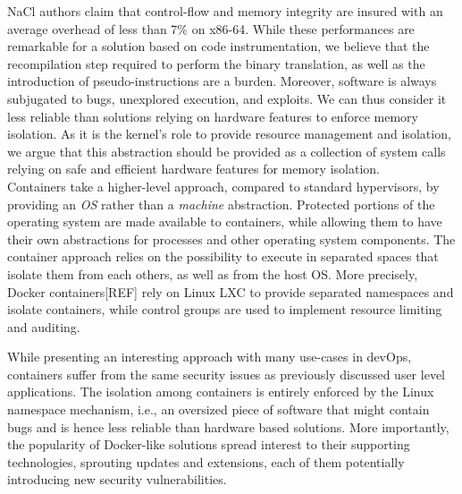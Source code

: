 \documentclass[letterpaper,twocolumn,10pt]{article}
\begin{document}
NaCl authors claim that control-flow and memory integrity are insured with an average overhead of less than 7\% on x86-64.
While these performances are remarkable for a solution based on code instrumentation, we believe that the recompilation step required to perform the binary translation, as well as the introduction of pseudo-instructions are a burden.
Moreover, software is always subjugated to bugs, unexplored execution, and exploits.
We can thus consider it less reliable than solutions relying on hardware features to enforce memory isolation.
As it is the kernel's role to provide resource management and isolation, we argue that this abstraction should be provided as a collection of system calls relying on safe and efficient hardware features for memory isolation. \\

Containers take a higher-level approach, compared to standard hypervisors, by providing an \emph{OS} rather than a \emph{machine} abstraction.
Protected portions of the operating system are made available to containers, while allowing them to have their own abstractions for processes and other operating system components.
The container approach relies on the possibility to execute in separated spaces that isolate them from each others, as well as from the host OS.
More precisely, Docker containers[REF] rely on Linux LXC to provide separated namespaces and isolate containers, while control groups are used to implement resource limiting and auditing.

While presenting an interesting approach with many use-cases in devOps, containers suffer from the same security issues as previously discussed user level applications.
The isolation among containers is entirely enforced by the Linux namespace mechanism, i.e., an oversized piece of software that might contain bugs and is hence less reliable than hardware based solutions.
More importantly, the popularity of Docker-like solutions spread interest to their supporting technologies, sprouting updates and extensions, each of them potentially introducing new security vulnerabilities.\\
\end{document}
